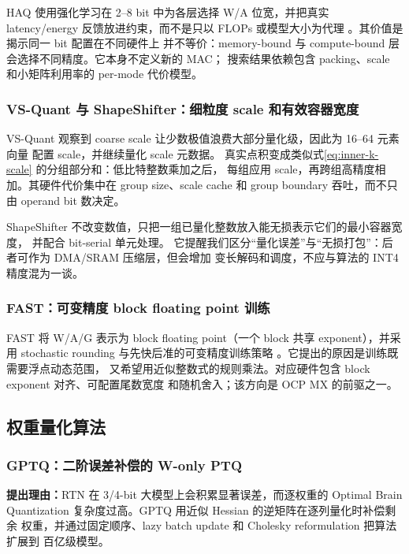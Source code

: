 HAQ 使用强化学习在 2--8 bit 中为各层选择 W/A 位宽，并把真实 latency/energy
反馈放进约束，而不是只以 FLOPs 或模型大小为代理
。其价值是揭示同一 bit 配置在不同硬件上
并不等价：memory-bound 与 compute-bound 层会选择不同精度。它本身不定义新的 MAC；
搜索结果依赖包含 packing、scale 和小矩阵利用率的 per-mode 代价模型。

\subsubsection{VS-Quant 与 ShapeShifter：细粒度 scale 和有效容器宽度}

VS-Quant 观察到 coarse scale 让少数极值浪费大部分量化级，因此为 16--64 元素向量
配置 scale，并继续量化 scale 元数据。
真实点积变成类似式\eqref{eq:inner-k-scale} 的分组部分和：低比特整数乘加之后，
每组应用 scale，再跨组高精度相加。其硬件代价集中在 group size、scale cache 和
group boundary 吞吐，而不只由 operand bit 数决定。

ShapeShifter 不改变数值，只把一组已量化整数放入能无损表示它们的最小容器宽度，
并配合 bit-serial 单元处理。
它提醒我们区分“量化误差”与“无损打包”：后者可作为 DMA/SRAM 压缩层，但会增加
变长解码和调度，不应与算法的 INT4 精度混为一谈。

\subsubsection{FAST：可变精度 block floating point 训练}

FAST 将 W/A/G 表示为 block floating point（一个 block 共享 exponent），并采用
stochastic rounding 与先快后准的可变精度训练策略
。它提出的原因是训练既需要浮点动态范围，
又希望用近似整数式的规则乘法。对应硬件包含 block exponent 对齐、可配置尾数宽度
和随机舍入；该方向是 OCP MX 的前驱之一。

\subsection{权重量化算法}

\subsubsection{GPTQ：二阶误差补偿的 W-only PTQ}

\textbf{提出理由：}RTN 在 3/4-bit 大模型上会积累显著误差，而逐权重的 Optimal
Brain Quantization 复杂度过高。GPTQ 用近似 Hessian 的逆矩阵在逐列量化时补偿剩余
权重，并通过固定顺序、lazy batch update 和 Cholesky reformulation 把算法扩展到
百亿级模型。

